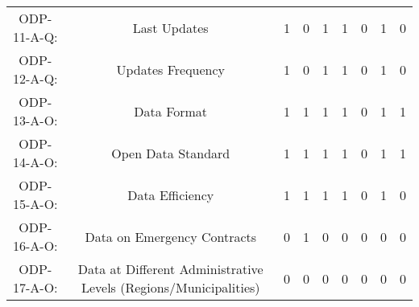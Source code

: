 \documentclass[a4paper, twoside]{report}
\begin{document}
\begin{table}[htbp]
\begin{adjustbox}{max width=\linewidth}
\begin{tabular}{rcccccccc}
    \midrule
    \multicolumn{1}{c}{ODP-11-A-Q:} & \multicolumn{1}{p{19em}}{\cellcolor[rgb]{ .749,  .749,  .749}Last Updates} & \cellcolor[rgb]{ .749,  .749,  .749}1 & \cellcolor[rgb]{ .749,  .749,  .749}0 & \cellcolor[rgb]{ .749,  .749,  .749}1 & \cellcolor[rgb]{ .749,  .749,  .749}1 & \cellcolor[rgb]{ .749,  .749,  .749}0 & \cellcolor[rgb]{ .749,  .749,  .749}1 & \cellcolor[rgb]{ .749,  .749,  .749}0 \\
    \multicolumn{1}{c}{ODP-12-A-Q:} & \multicolumn{1}{p{19em}}{\cellcolor[rgb]{ .749,  .749,  .749}Updates Frequency} & \cellcolor[rgb]{ .749,  .749,  .749}1 & \cellcolor[rgb]{ .749,  .749,  .749}0 & \cellcolor[rgb]{ .749,  .749,  .749}1 & \cellcolor[rgb]{ .749,  .749,  .749}1 & \cellcolor[rgb]{ .749,  .749,  .749}0 & \cellcolor[rgb]{ .749,  .749,  .749}1 & \cellcolor[rgb]{ .749,  .749,  .749}0 \\
    \midrule
    \multicolumn{1}{c}{ODP-13-A-O:} & \multicolumn{1}{p{19em}}{Data Format} & 1     & 1     & 1     & 1     & 0     & 1     & 1 \\
    \multicolumn{1}{c}{ODP-14-A-O:} & \multicolumn{1}{p{19em}}{\cellcolor[rgb]{ .749,  .749,  .749}Open Data Standard} & \cellcolor[rgb]{ .749,  .749,  .749}1 & \cellcolor[rgb]{ .749,  .749,  .749}1 & \cellcolor[rgb]{ .749,  .749,  .749}1 & \cellcolor[rgb]{ .749,  .749,  .749}1 & \cellcolor[rgb]{ .749,  .749,  .749}0 & \cellcolor[rgb]{ .749,  .749,  .749}1 & \cellcolor[rgb]{ .749,  .749,  .749}1 \\
    \multicolumn{1}{c}{ODP-15-A-O:} & \multicolumn{1}{p{19em}}{Data Efficiency} & 1     & 1     & 1     & 1     & 0     & 1     & 0 \\
    \multicolumn{1}{c}{ODP-16-A-O:} & \multicolumn{1}{p{19em}}{\cellcolor[rgb]{ .749,  .749,  .749}Data on Emergency Contracts} & \cellcolor[rgb]{ .749,  .749,  .749}0 & \cellcolor[rgb]{ .749,  .749,  .749}1 & \cellcolor[rgb]{ .749,  .749,  .749}0 & \cellcolor[rgb]{ .749,  .749,  .749}0 & \cellcolor[rgb]{ .749,  .749,  .749}0 & \cellcolor[rgb]{ .749,  .749,  .749}0 & \cellcolor[rgb]{ .749,  .749,  .749}0 \\
    \multicolumn{1}{c}{ODP-17-A-O:} & \multicolumn{1}{p{19em}}{\cellcolor[rgb]{ .749,  .749,  .749}Data at Different Administrative Levels (Regions/Municipalities)} & \cellcolor[rgb]{ .749,  .749,  .749}0 & \cellcolor[rgb]{ .749,  .749,  .749}0 & \cellcolor[rgb]{ .749,  .749,  .749}0 & \cellcolor[rgb]{ .749,  .749,  .749}0 & \cellcolor[rgb]{ .749,  .749,  .749}0 & \cellcolor[rgb]{ .749,  .749,  .749}0 & \cellcolor[rgb]{ .749,  .749,  .749}0 \\

\end{tabular}
\end{adjustbox}
\end{table}
\end{document}
